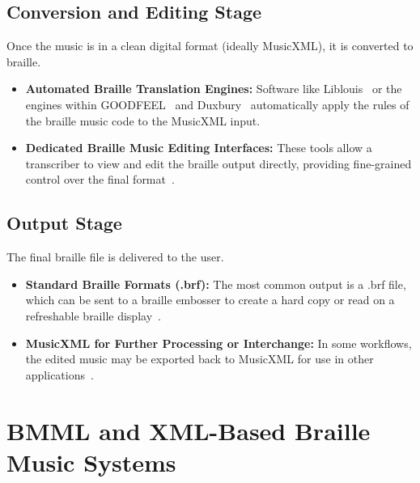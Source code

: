 \subsection{Conversion and Editing Stage}\label{ch10:ssec:conversion-editing-stage}
Once the music is in a clean digital format (ideally \gls{MusicXML}), it is converted to braille.
\begin{itemize}
	\item \textbf{Automated Braille Translation Engines:} Software like Liblouis~\supercite{LiblouisGitHub} or the engines within GOODFEEL~\supercite{dancingdots-goodfeel} and Duxbury~\supercite{DuxburyDBT} automatically apply the rules of the braille music code to the \gls{MusicXML} input.
	\item \textbf{Dedicated Braille Music Editing Interfaces:} These tools allow a transcriber to view and edit the braille output directly, providing fine-grained control over the final format~\supercite{braillemusiceditor, braillemusicnotator}.
\end{itemize}

\subsection{Output Stage}\label{ch10:ssec:output-stage}
The final braille file is delivered to the user.
\begin{itemize}
	\item \textbf{Standard Braille Formats (.brf):} The most common output is a .brf file, which can be sent to a braille embosser to create a hard copy or read on a refreshable braille display~\supercite{BRLFormat}.
	\item \textbf{MusicXML for Further Processing or Interchange:} In some workflows, the edited music may be exported back to \gls{MusicXML} for use in other applications~\supercite{daisy-musicxml}.
\end{itemize}

\section{BMML and XML-Based Braille Music Systems}\label{ch10:sec:bmml-xml-systems}

